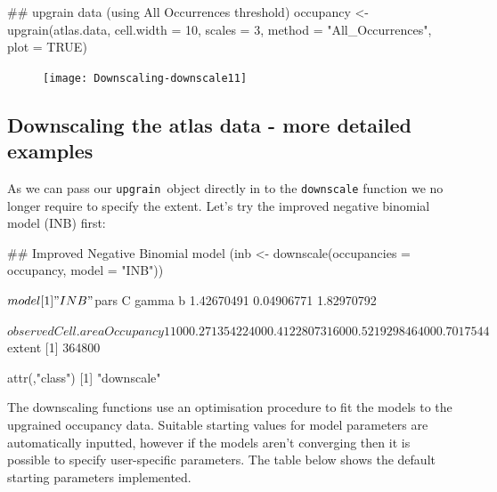 \documentclass{article}[12pt, a4paper]
\begin{document}
\begin{Schunk}
\begin{Sinput}
## upgrain data (using All Occurrences threshold)
occupancy <- upgrain(atlas.data,
                     cell.width = 10,
                     scales = 3,
                     method = "All_Occurrences",
                     plot = TRUE)
\end{Sinput}
\end{Schunk}
\begin{figure}[!h]
\centering
\texttt{[image: Downscaling-downscale11]}
\end{figure}

\subsection{Downscaling the atlas data - more detailed examples}

As we can pass our \textquotesingle \texttt{upgrain}\textquotesingle\ object directly in to the \texttt{downscale} function we no longer require to specify the extent. Let’s try the improved negative binomial model (INB) first:

\begin{Schunk}
\begin{Sinput}
## Improved Negative Binomial model
(inb <- downscale(occupancies = occupancy,
                  model = "INB"))
\end{Sinput}
\begin{Soutput}
$model
[1] "INB"

$pars
         C      gamma          b 
1.42670491 0.04906771 1.82970792 

$observed
  Cell.area Occupancy
1       100 0.2713542
2       400 0.4122807
3      1600 0.5219298
4      6400 0.7017544

$extent
[1] 364800

attr(,"class")
[1] "downscale"

\end{Soutput}
\end{Schunk}

The downscaling functions use an optimisation procedure to fit the models to the upgrained occupancy data. Suitable starting values for model parameters are automatically inputted, however if the models aren’t converging then it is possible to specify user-specific parameters. The table below shows the default starting parameters implemented.
\end{document}
